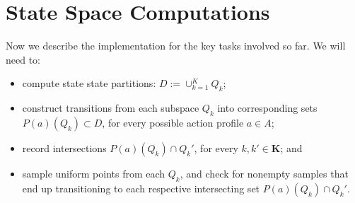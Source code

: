\documentclass[a4paper,10pt,english]{sphinxmanual}
\begin{document}
\begin{DUlineblock}{0em}
\item[] 
\item[] 
\item[] 
\item[] 
\item[] 
\end{DUlineblock}


\chapter{State Space Computations}
\label{compute_statespace::doc}\label{compute_statespace:state-space-computations}
Now we describe the implementation for the key tasks involved so far. We will need to:
\begin{itemize}
\item {} 
compute state state partitions: \(D := \cup_{k=1}^{K}Q_k\);

\item {} 
construct transitions from each subspace \(Q_k\) into corresponding sets
\(P(a)(Q_k) \subset D\), for every possible action profile \(a \in A\);

\item {} 
record intersections \(P(a)(Q_k) \cap Q_k'\), for every \(k,k' \in \mathbf{K}\); and

\item {} 
sample uniform points from each \(Q_k\), and check for nonempty samples that end up transitioning to each respective intersecting set \(P(a)(Q_k) \cap Q_k'\).

\end{itemize}
\end{document}
